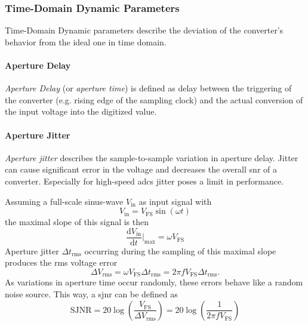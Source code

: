 \subsubsection{Time-Domain Dynamic Parameters}\label{ssec:time_param}
Time-Domain Dynamic parameters describe the deviation of the converter's behavior from the ideal one in time domain. 

\paragraph{Aperture Delay}
\textit{Aperture Delay} (or \textit{aperture time}) is defined as delay between the triggering of the converter (e.g. rising edge of the sampling clock) and the actual conversion of the input voltage into the digitized value. \cite{Lundberg}

\paragraph{Aperture Jitter}
\textit{Aperture jitter} describes the sample-to-sample variation in aperture delay. Jitter can cause significant error in the voltage and decreases the overall \gls{snr} of a converter.
Especially for high-speed \glspl{adc} jitter poses a limit in performance.

Assuming a full-scale sinus-wave $V_{\text{in}}$ as input signal with 
\begin{equation}
	V_{\text{in}} = V_{\text{FS}} \sin(\omega t)
\end{equation}
the maximal slope of this signal is then
\begin{equation}
	\frac{\text{d}V_{\text{in}}}{\text{d}t}\Bigr|_{\text{max}} = \omega V_{\text{FS}}
\end{equation}
Aperture jitter $\Delta t_{\text{rms}}$ occurring during the sampling of this maximal slope produces the \gls{rms} voltage error 
\begin{equation}
	\Delta V_{\text{rms}} = \omega  V_{\text{FS}} \Delta t_{\text{rms}} = 2 \pi f  V_{\text{FS}} \Delta t_{\text{rms}}.
\end{equation}
As variations in aperture time occur randomly, these errors behave like a random noise source. This way, a \gls{sjnr} can be defined as
\begin{equation}
	\text{SJNR} = 20 \log \left( \frac{V_{\text{FS}}}{\Delta V_{\text{rms}}} \right) = 20 \log \left( \frac{1}{2 \pi f  V_{\text{FS}}} \right)
\end{equation}


